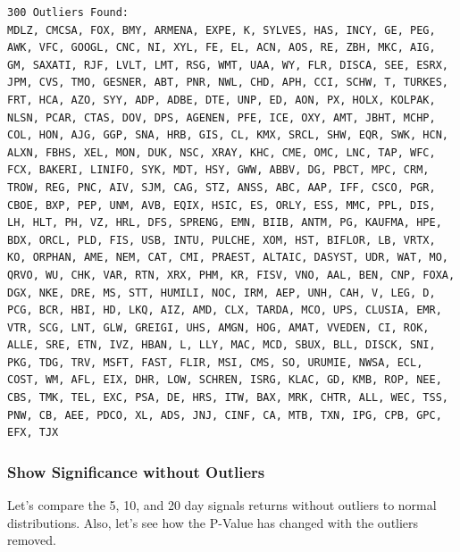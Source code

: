 \documentclass[11pt]{article}
\begin{document}
    \begin{Verbatim}[commandchars=\\\{\}]
300 Outliers Found:
MDLZ, CMCSA, FOX, BMY, ARMENA, EXPE, K, SYLVES, HAS, INCY, GE, PEG, AWK, VFC, GOOGL, CNC, NI, XYL, FE, EL, ACN, AOS, RE, ZBH, MKC, AIG, GM, SAXATI, RJF, LVLT, LMT, RSG, WMT, UAA, WY, FLR, DISCA, SEE, ESRX, JPM, CVS, TMO, GESNER, ABT, PNR, NWL, CHD, APH, CCI, SCHW, T, TURKES, FRT, HCA, AZO, SYY, ADP, ADBE, DTE, UNP, ED, AON, PX, HOLX, KOLPAK, NLSN, PCAR, CTAS, DOV, DPS, AGENEN, PFE, ICE, OXY, AMT, JBHT, MCHP, COL, HON, AJG, GGP, SNA, HRB, GIS, CL, KMX, SRCL, SHW, EQR, SWK, HCN, ALXN, FBHS, XEL, MON, DUK, NSC, XRAY, KHC, CME, OMC, LNC, TAP, WFC, FCX, BAKERI, LINIFO, SYK, MDT, HSY, GWW, ABBV, DG, PBCT, MPC, CRM, TROW, REG, PNC, AIV, SJM, CAG, STZ, ANSS, ABC, AAP, IFF, CSCO, PGR, CBOE, BXP, PEP, UNM, AVB, EQIX, HSIC, ES, ORLY, ESS, MMC, PPL, DIS, LH, HLT, PH, VZ, HRL, DFS, SPRENG, EMN, BIIB, ANTM, PG, KAUFMA, HPE, BDX, ORCL, PLD, FIS, USB, INTU, PULCHE, XOM, HST, BIFLOR, LB, VRTX, KO, ORPHAN, AME, NEM, CAT, CMI, PRAEST, ALTAIC, DASYST, UDR, WAT, MO, QRVO, WU, CHK, VAR, RTN, XRX, PHM, KR, FISV, VNO, AAL, BEN, CNP, FOXA, DGX, NKE, DRE, MS, STT, HUMILI, NOC, IRM, AEP, UNH, CAH, V, LEG, D, PCG, BCR, HBI, HD, LKQ, AIZ, AMD, CLX, TARDA, MCO, UPS, CLUSIA, EMR, VTR, SCG, LNT, GLW, GREIGI, UHS, AMGN, HOG, AMAT, VVEDEN, CI, ROK, ALLE, SRE, ETN, IVZ, HBAN, L, LLY, MAC, MCD, SBUX, BLL, DISCK, SNI, PKG, TDG, TRV, MSFT, FAST, FLIR, MSI, CMS, SO, URUMIE, NWSA, ECL, COST, WM, AFL, EIX, DHR, LOW, SCHREN, ISRG, KLAC, GD, KMB, ROP, NEE, CBS, TMK, TEL, EXC, PSA, DE, HRS, ITW, BAX, MRK, CHTR, ALL, WEC, TSS, PNW, CB, AEE, PDCO, XL, ADS, JNJ, CINF, CA, MTB, TXN, IPG, CPB, GPC, EFX, TJX

    \end{Verbatim}

    \hypertarget{show-significance-without-outliers}{%
\subsubsection{Show Significance without
Outliers}\label{show-significance-without-outliers}}

Let's compare the 5, 10, and 20 day signals returns without outliers to
normal distributions. Also, let's see how the P-Value has changed with
the outliers removed.
\end{document}
